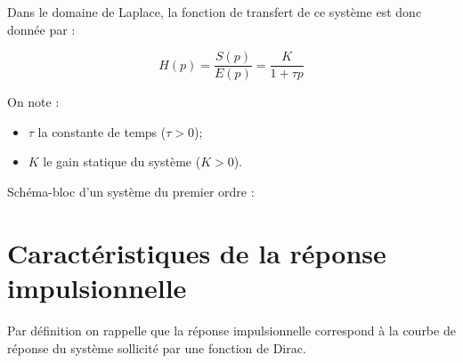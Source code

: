 \documentclass[11pt,oneside]{article}
\begin{document}
\begin{minipage}[c]{.6\linewidth}
\begin{defi}
Dans le domaine de Laplace, la fonction de transfert de ce système est donc
donnée par :

$$
H(p)=\dfrac{S(p)}{E(p)} = \dfrac{K}{1+\tau p}
$$

On note :
\begin{itemize}
 \item $\tau$ la constante de temps ($\tau>0$);
\item $K$ le gain statique du système ($K>0$).
\end{itemize}
\end{defi}
\end{minipage}\hfill
\begin{minipage}[c]{.35\linewidth}
Schéma-bloc d'un système du premier ordre :

\begin{center}
\end{center}
\end{minipage}

\section{Caractéristiques de la réponse impulsionnelle}
Par définition on rappelle que la réponse impulsionnelle correspond à la courbe de réponse du système sollicité par une fonction de Dirac.
\end{document}
